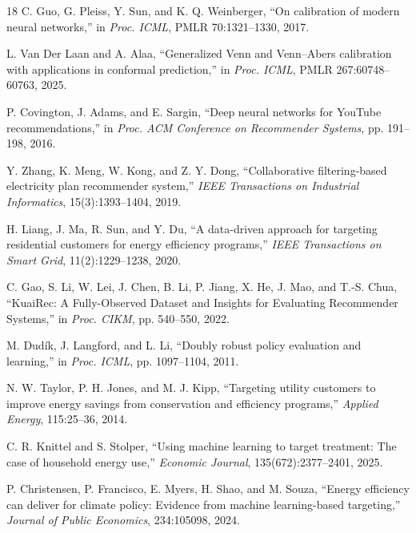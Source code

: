 \documentclass[11pt]{article}
\theoremstyle{noteplain}
\theoremstyle{definition}
\begin{document}
\begin{thebibliography}{18}
C. Guo, G. Pleiss, Y. Sun, and K. Q. Weinberger, ``On calibration of modern neural networks,'' in \emph{Proc. ICML}, PMLR 70:1321--1330, 2017.

L. Van Der Laan and A. Alaa, ``Generalized Venn and Venn--Abers calibration with applications in conformal prediction,'' in \emph{Proc. ICML}, PMLR 267:60748--60763, 2025.

P. Covington, J. Adams, and E. Sargin, ``Deep neural networks for YouTube recommendations,'' in \emph{Proc. ACM Conference on Recommender Systems}, pp. 191--198, 2016.

Y. Zhang, K. Meng, W. Kong, and Z. Y. Dong, ``Collaborative filtering-based electricity plan recommender system,'' \emph{IEEE Transactions on Industrial Informatics}, 15(3):1393--1404, 2019.

H. Liang, J. Ma, R. Sun, and Y. Du, ``A data-driven approach for targeting residential customers for energy efficiency programs,'' \emph{IEEE Transactions on Smart Grid}, 11(2):1229--1238, 2020.

C. Gao, S. Li, W. Lei, J. Chen, B. Li, P. Jiang, X. He, J. Mao, and T.-S. Chua, ``KuaiRec: A Fully-Observed Dataset and Insights for Evaluating Recommender Systems,'' in \emph{Proc. CIKM}, pp. 540--550, 2022.

M. Dud\'{i}k, J. Langford, and L. Li, ``Doubly robust policy evaluation and learning,'' in \emph{Proc. ICML}, pp. 1097--1104, 2011.

N. W. Taylor, P. H. Jones, and M. J. Kipp, ``Targeting utility customers to improve energy savings from conservation and efficiency programs,'' \emph{Applied Energy}, 115:25--36, 2014.

C. R. Knittel and S. Stolper, ``Using machine learning to target treatment: The case of household energy use,'' \emph{Economic Journal}, 135(672):2377--2401, 2025.

P. Christensen, P. Francisco, E. Myers, H. Shao, and M. Souza, ``Energy efficiency can deliver for climate policy: Evidence from machine learning-based targeting,'' \emph{Journal of Public Economics}, 234:105098, 2024.

\end{thebibliography}
\end{document}
